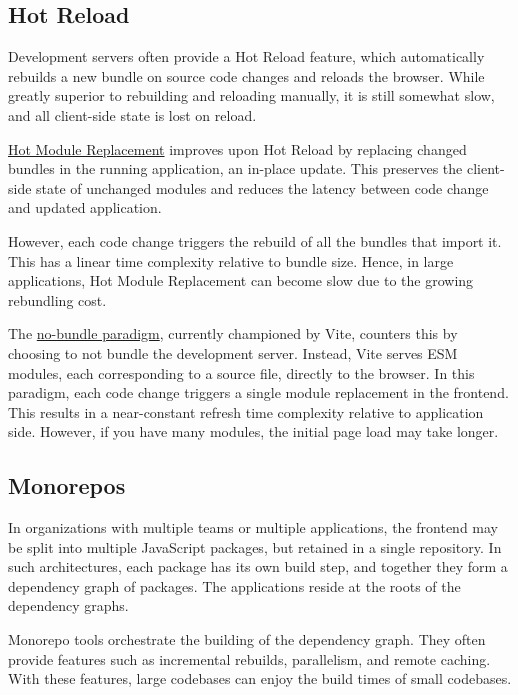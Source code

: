 \documentclass{article}
\begin{document}
\subsection{Hot Reload}

Development servers often provide a Hot Reload feature, which automatically rebuilds a new bundle on
source code changes and reloads the browser. While greatly superior to rebuilding and reloading
manually, it is still somewhat slow, and all client-side state is lost on reload.

\href{https://webpack.js.org/concepts/hot-module-replacement/}{Hot Module Replacement} improves upon
Hot Reload by replacing changed bundles in the running application, an in-place update. This
preserves the client-side state of unchanged modules and reduces the latency between code change and
updated application.

However, each code change triggers the rebuild of all the bundles that import it. This has a linear
time complexity relative to bundle size. Hence, in large applications, Hot Module Replacement can
become slow due to the growing rebundling cost.

The \href{https://vitejs.dev/guide/why.html}{no-bundle paradigm}, currently championed by Vite,
counters this by choosing to not bundle the development server. Instead, Vite serves ESM modules,
each corresponding to a source file, directly to the browser. In this paradigm, each code change
triggers a single module replacement in the frontend. This results in a near-constant refresh time
complexity relative to application side. However, if you have many modules, the initial page load
may take longer.

\subsection{Monorepos}

In organizations with multiple teams or multiple applications, the frontend may be split into
multiple JavaScript packages, but retained in a single repository. In such architectures, each
package has its own build step, and together they form a dependency graph of packages. The
applications reside at the roots of the dependency graphs.

Monorepo tools orchestrate the building of the dependency graph. They often provide features such as
incremental rebuilds, parallelism, and remote caching. With these features, large codebases can
enjoy the build times of small codebases.
\end{document}
